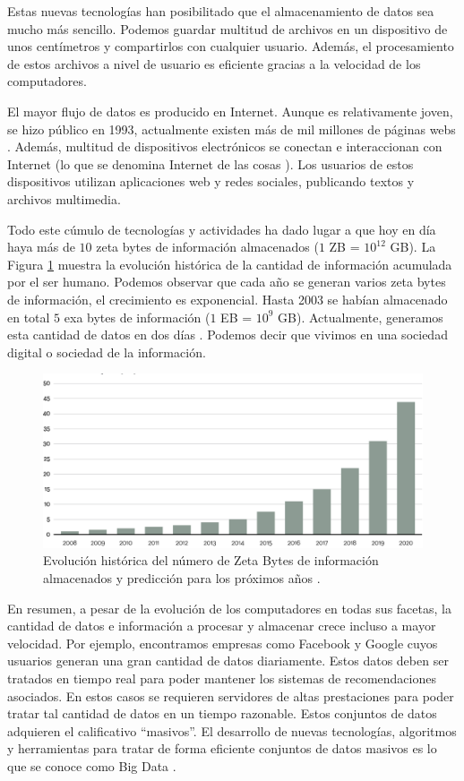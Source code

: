 \documentclass[10pt]{article}
\begin{document}
	Estas nuevas tecnologías han posibilitado que el almacenamiento de datos sea mucho más sencillo. Podemos guardar multitud de archivos en un dispositivo de unos centímetros y compartirlos con cualquier usuario. Además, el procesamiento de estos archivos a nivel de usuario es eficiente gracias a la velocidad de los computadores. 
	
	El mayor flujo de datos es producido en Internet. Aunque es relativamente joven, se hizo público en 1993, actualmente existen más de mil millones de páginas webs \cite{internet}. Además, multitud de dispositivos electrónicos se conectan e interaccionan con Internet (lo que se denomina Internet de las cosas \cite{big-data-internet-cosas}). Los usuarios de estos dispositivos utilizan aplicaciones web y redes sociales, publicando textos y archivos multimedia. 
	
	Todo este cúmulo de tecnologías y actividades ha dado lugar a que hoy en día haya más de $10$ zeta bytes de información almacenados ($1$ ZB = $10^{12}$ GB). La Figura \ref{fig:zeta-bytes} muestra la evolución histórica de la cantidad de información acumulada por el ser humano. Podemos observar que cada año se generan varios zeta bytes de información, el crecimiento es exponencial. Hasta 2003 se habían almacenado en total $5$ exa bytes de información ($1$ EB = $10^9$ GB). Actualmente, generamos esta cantidad de datos en dos días \cite{big-data}. Podemos decir que vivimos en una sociedad digital o sociedad de la información.

	\begin{figure}[H]
       	\centering
       	\includegraphics[width=14cm]{./images/Data.png}
       	\caption{Evolución histórica del número de Zeta Bytes de información almacenados y predicción para los próximos años \cite{zeta-bytes}.} 
       	\label{fig:zeta-bytes}
	 \end{figure}

	En resumen, a pesar de la evolución de los computadores en todas sus facetas, la cantidad de datos e información a procesar y almacenar crece incluso a mayor velocidad. Por ejemplo, encontramos empresas como Facebook y Google cuyos usuarios generan una gran cantidad de datos diariamente. Estos datos deben ser tratados en tiempo real para poder mantener los sistemas de recomendaciones asociados. En estos casos se requieren servidores de altas prestaciones para poder tratar tal cantidad de datos en un tiempo razonable. Estos conjuntos de datos adquieren el calificativo ``masivos''. El desarrollo de nuevas tecnologías, algoritmos y herramientas para tratar de forma eficiente conjuntos de datos masivos es lo que se conoce como Big Data \cite{big-data-herrera}.
	
\end{document}
